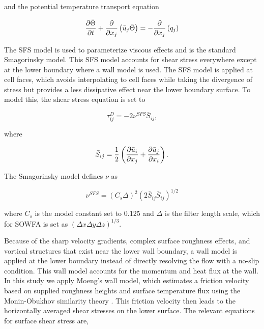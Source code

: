 and the potential temperature transport equation

\begin{equation}
   \label{potential temp}
   \frac{\partial \bar{\Theta}}{\partial t} + \frac{\partial}{\partial x_j}\left(\bar{u}_j \bar{\Theta} \right)
   = - \frac{\partial}{\partial x_j}\left( q_j\right) 
\end{equation}

The SFS model is used to parameterize viscous effects and is the standard Smagorinsky model.  This SFS model accounts for shear stress everywhere except at the lower boundary where a wall model is used.  The SFS model is applied at cell faces, which avoids interpolating to cell faces while taking the divergence of stress but provides a less dissipative effect near the lower boundary surface.  To model this, the shear stress equation is set to

\begin{equation}
   \label{eq:smagorinsky}
   \tau^D_{ij} = -2 \nu^{SFS} \bar{S}_{ij},
\end{equation}

where

\begin{equation}
   \bar{S}_{ij} = \frac{1}{2} \left( \frac{\partial \bar{u}_i}{\partial x_j} + \frac{\partial \bar{u}_j}{\partial x_i} \right).
\end{equation}

The Smagorinsky model defines $\nu$ as

\begin{equation}
   \nu^{SFS} = (C_s \Delta)^2(2\bar{S}_{ij}\bar{S}_{ij})^{1/2}
\end{equation}

where $C_s$ is the model constant set to 0.125 and $\Delta$ is the filter length scale, which for SOWFA is set as $(\Delta x \Delta y \Delta z)^{1/3}$.

Because of the sharp velocity gradients, complex surface roughness effects, and vortical structures that exist near the lower wall boundary, a wall model is applied at the lower boundary instead of directly resolving the flow with a no-slip condition.  This wall model accounts for the momentum and heat flux at the wall.  In this study we apply Moeng's wall model, which estimates a friction velocity based on supplied roughness heights and surface temperature flux using the Monin-Obukhov similarity theory \cite{moeng_large-eddy-simulation_1984}.  This friction velocity then leads to the horizontally averaged shear stresses on the lower surface.  The relevant equations for surface shear stress are,

